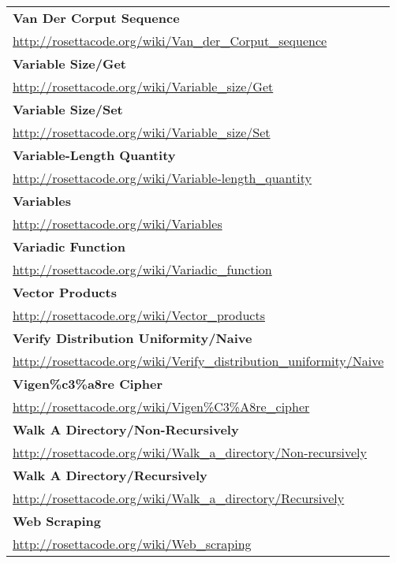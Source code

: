 \begin{longtable}{l}
\textbf{Van Der Corput Sequence } \\ \href{http://rosettacode.org/wiki/Van\_der\_Corput\_sequence}{http://rosettacode.org/wiki/Van\_der\_Corput\_sequence} \\
\textbf{Variable Size/Get } \\ \href{http://rosettacode.org/wiki/Variable\_size/Get}{http://rosettacode.org/wiki/Variable\_size/Get} \\
\textbf{
Variable Size/Set } \\ \href{http://rosettacode.org/wiki/Variable\_size/Set}{http://rosettacode.org/wiki/Variable\_size/Set} \\
\textbf{Variable-Length Quantity } \\ \href{http://rosettacode.org/wiki/Variable-length\_quantity}{http://rosettacode.org/wiki/Variable-length\_quantity} \\
\textbf{Variables } \\ \href{http://rosettacode.org/wiki/Variables}{http://rosettacode.org/wiki/Variables} \\
\textbf{
Variadic Function } \\ \href{http://rosettacode.org/wiki/Variadic\_function}{http://rosettacode.org/wiki/Variadic\_function} \\
\textbf{Vector Products } \\ \href{http://rosettacode.org/wiki/Vector\_products}{http://rosettacode.org/wiki/Vector\_products} \\
\textbf{
Verify Distribution Uniformity/Naive } \\ \href{http://rosettacode.org/wiki/Verify\_distribution\_uniformity/Naive}{http://rosettacode.org/wiki/Verify\_distribution\_uniformity/Naive} \\
\textbf{Vigen\%c3\%a8re Cipher } \\ \href{http://rosettacode.org/wiki/Vigen\%C3\%A8re\_cipher}{http://rosettacode.org/wiki/Vigen\%C3\%A8re\_cipher} \\
\textbf{
Walk A Directory/Non-Recursively } \\ \href{http://rosettacode.org/wiki/Walk\_a\_directory/Non-recursively}{http://rosettacode.org/wiki/Walk\_a\_directory/Non-recursively} \\
\textbf{Walk A Directory/Recursively } \\ \href{http://rosettacode.org/wiki/Walk\_a\_directory/Recursively}{http://rosettacode.org/wiki/Walk\_a\_directory/Recursively} \\
\textbf{
Web Scraping } \\ \href{http://rosettacode.org/wiki/Web\_scraping}{http://rosettacode.org/wiki/Web\_scraping} \\

\end{longtable}
